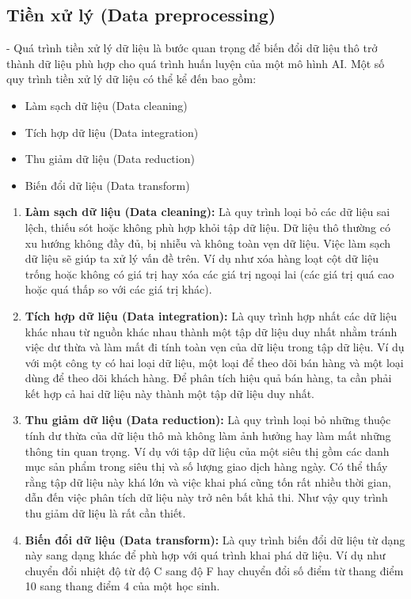 \subsection{Tiền xử lý (Data preprocessing)} 
- Quá trình tiền xử lý dữ liệu \cite{data_pre} là bước quan trọng để biến đổi dữ liệu thô trở thành dữ liệu phù hợp cho quá trình huấn luyện của một mô hình AI. Một số quy trình tiền xử lý dữ liệu có thể kể đến bao gồm:
\begin{itemize}
    \item Làm sạch dữ liệu (Data cleaning)
    \item Tích hợp dữ liệu (Data integration)
    \item Thu giảm dữ liệu (Data reduction)
    \item Biến đổi dữ liệu (Data transform)
\end{itemize}
\begin{enumerate}
    \item \textbf{Làm sạch dữ liệu (Data cleaning): } Là quy trình loại bỏ các dữ liệu sai lệch, thiếu sót hoặc không phù hợp khỏi tập dữ liệu. Dữ liệu thô thường có xu hướng không đầy đủ, bị nhiễu và không toàn vẹn dữ liệu. Việc làm sạch dữ liệu sẽ giúp ta xử lý vấn đề trên. Ví dụ như xóa hàng loạt cột dữ liệu trống hoặc không có giá trị hay xóa các giá trị ngoại lai (các giá trị quá cao hoặc quá thấp so với các giá trị khác).
    \item \textbf{Tích hợp dữ liệu (Data integration):} Là quy trình hợp nhất các dữ liệu khác nhau từ nguồn khác nhau thành một tập dữ liệu duy nhất nhằm tránh việc dư thừa và làm mất đi tính toàn vẹn của dữ liệu trong tập dữ liệu. Ví dụ với một công ty có hai loại dữ liệu, một loại để theo dõi bán hàng và một loại dùng để theo dõi khách hàng. Để phân tích hiệu quả bán hàng, ta cần phải kết hợp cả hai dữ liệu này thành một tập dữ liệu duy nhất.
    \item \textbf{Thu giảm dữ liệu (Data reduction):} Là quy trình loại bỏ những thuộc tính dư thừa của dữ liệu thô mà không làm ảnh hưởng hay làm mất những thông tin quan trọng. Ví dụ với tập dữ liệu của một siêu thị gồm các danh mục sản phẩm trong siêu thị và số lượng giao dịch hàng ngày. Có thể thấy rằng tập dữ liệu này khá lớn và việc khai phá cũng tốn rất nhiều thời gian, dẫn đến việc phân tích dữ liệu này trở nên bất khả thi. Như vậy quy trình thu giảm dữ liệu là rất cần thiết.
    \item \textbf{Biến đổi dữ liệu (Data transform):} Là quy trình biến đổi dữ liệu từ dạng này sang dạng khác để phù hợp với quá trình khai phá dữ liệu. Ví dụ như chuyển đổi nhiệt độ từ độ C sang độ F hay chuyển đổi số điểm từ thang điểm 10 sang thang điểm 4 của một học sinh.
\end{enumerate}

